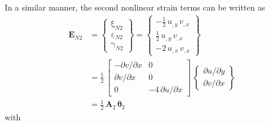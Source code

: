 In a similar manner, the second nonlinear strain terms can be written as
\begin{equation}
\begin{aligned}
\mathbf{E}_{N2} & =  \begin{Bmatrix}
\mathrm \xi_{N2} \\
\mathrm \varepsilon_{N2} \\
\mathrm \gamma_{N2} \end{Bmatrix} =
\begin{Bmatrix}
-\tfrac{1}{2} \, u_{,y} \, v_{,x}  \\
\tfrac{1}{2} \, u_{,y} \, v_{,x} \\
-2 \, u_{,x} \, v_{,x} \end{Bmatrix} \\ 
& = \frac{1}{2} \, \begin{bmatrix}
- \partial v / \partial x &  0 \\
\partial v / \partial x & 0 \\
0 & -4 \, \partial u / \partial x  \end{bmatrix} \, \begin{Bmatrix}
\partial u / \partial y\\
\partial v / \partial x
\end{Bmatrix} \\
& = \tfrac{1}{2} \, \mathbf{A}_2 \, \boldsymbol{\theta}_2
\end{aligned}
\end{equation}
with  
